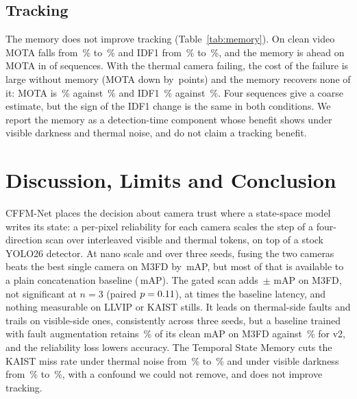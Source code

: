 \subsection{Tracking}
\label{sec:kaisttracking}
The memory does not improve tracking (Table~\ref{tab:memory}). On clean video MOTA falls from \trkCleanImageMota{}\,\% to \trkCleanMemoryMota{}\,\% and IDF1 from \trkCleanImageIdfOne{}\,\% to \trkCleanMemoryIdfOne{}\,\%, and the memory is ahead on MOTA in \trkCleanMemoryWinsMota{} of \trkSeqCount{} sequences. With the thermal camera failing, the cost of the failure is large without memory (MOTA down by \trkFaultCostImageMota{}\,points) and the memory recovers none of it: MOTA is \trkThermalLostMemoryMota{}\,\% against \trkThermalLostImageMota{}\,\% and IDF1 \trkThermalLostMemoryIdfOne{}\,\% against \trkThermalLostImageIdfOne{}\,\%. Four sequences give a coarse estimate, but the sign of the IDF1 change is the same in both conditions. We report the memory as a detection-time component whose benefit shows under visible darkness and thermal noise, and do not claim a tracking benefit.

\section{Discussion, Limits and Conclusion}
\label{sec:discussion}
\label{sec:conclusion}
CFFM-Net places the decision about camera trust where a state-space model writes its state: a per-pixel reliability for each camera scales the step of a four-direction scan over interleaved visible and thermal tokens, on top of a stock YOLO26 detector. At nano scale and over three seeds, fusing the two cameras beats the best single camera on M3FD by \gainMfdCffmVtwoOverBestMeanMap{}\,mAP, but most of that is available to a plain concatenation baseline (\gainMfdConcatMdOverBestMeanMap{}\,mAP). The gated scan adds \marMfdVtwoVsConcatMdMeanMap{}\,$\pm$\,\marMfdVtwoVsConcatMdStdMap{}\,mAP on M3FD, not significant at $n=3$ (paired $p=0.11{}$), at \latLocalRatioMedian{} times the baseline latency, and nothing measurable on LLVIP or KAIST stills. It leads on thermal-side faults and trails on visible-side ones, consistently across three seeds, but a baseline trained with fault augmentation retains \fltMfdConcatFtRetainedSevThreePercent{}\,\% of its clean mAP on M3FD against \fltMfdCffmVtwoMeanRetainedSevThreePercent{}\,\% for v2, and the reliability loss lowers accuracy. The Temporal State Memory cuts the KAIST miss rate under thermal noise from \memThermalNoiseImageAllMr{}\,\% to \memThermalNoiseMemoryAllMr{}\,\% and under visible darkness from \memVisibleDarkImageAllMr{}\,\% to \memVisibleDarkMemoryAllMr{}\,\%, with a confound we could not remove, and does not improve tracking.

